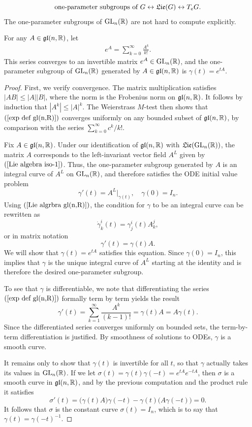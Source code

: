 \[\text{one-parameter subgroups of $G$}\leftrightarrow\mathfrak{Lie}(G)\leftrightarrow T_eG.\]
The one-parameter subgroups of $\mathrm{GL}_n(\mathbb{R})$ are not hard to compute explicitly.
\begin{proposition}
For any $A\in\mathfrak{gl}(n,\mathbb{R})$, let
\begin{align}\label{exp def gl(n,R)}
e^A=\sum_{k=0}^{\infty}\frac{A^k}{k!}.
\end{align}
This series converges to an invertible matrix $e^A\in\mathrm{GL}_n(\mathbb{R})$, and the one-parameter subgroup of $\mathrm{GL}_n(\mathbb{R})$ generated by $A\in\mathfrak{gl}(n,\mathbb{R})$ is $\gamma(t)=e^{tA}$.
\end{proposition}
\begin{proof}
First, we verify convergence. The matrix multiplication satisfies $|AB|\leq|A||B|$, where the norm is the Frobenius norm on $\mathfrak{gl}(n,\mathbb{R})$. It follows by induction that $|A^k|\leq |A|^k$. The Weierstrass $M$-test then shows that $(\ref{exp def gl(n,R)})$ converges uniformly on any bounded subset of $\mathfrak{gl}(n,\mathbb{R})$, by comparison with the series $\sum_{k=0}^{\infty}c^k/k!$.\par
Fix $A\in\mathfrak{gl}(n,\mathbb{R})$. Under our identification of $\mathfrak{gl}(n,\mathbb{R})$ with $\mathfrak{Lie}(\mathrm{GL}_n(\mathbb{R}))$, the matrix $A$ corresponds to the left-invariant vector field $A^L$ given by $(\ref{Lie algebra iso-1})$. Thus, the one-parameter subgroup generated by $A$ is an integral curve of $A^L$ on $\mathrm{GL}_n(\mathbb{R})$, and therefore satisfies the ODE initial value problem
\[\gamma'(t)=A^L|_{\gamma(t)},\quad \gamma(0)=I_n.\]
Using $(\ref{Lie algrbra gl(n,R)})$, the condition for $\gamma$ to be an integral curve can be rewritten as
\[\dot{\gamma}^i_k(t)=\gamma^i_j(t)A^j_k,\]
or in matrix notation
\[\gamma'(t)=\gamma(t)A.\]
We will show that $\gamma(t)=e^{tA}$ satisfies this equation. Since $\gamma(0)=I_n$, this implies that $\gamma$ is the unique integral curve of $A^L$ starting at the identity and is therefore the desired one-parameter subgroup.\par
To see that $\gamma$ is differentiable, we note that differentiating the series $(\ref{exp def gl(n,R)})$ formally term by term yields the result
\[\gamma'(t)=\sum_{k=1}^{\infty}\frac{A^k}{(k-1)!}=\gamma(t)A=A\gamma(t).\]
Since the differentiated series converges uniformly on bounded sets, the term-by-term differentiation is justified. By smoothness of solutions to ODEs, $\gamma$ is a smooth curve.\par
It remains only to show that $\gamma(t)$ is invertible for all $t$, so that $\gamma$ actually takes its values in $\mathrm{GL}_n(\mathbb{R})$. If we let $\sigma(t)=\gamma(t)\gamma(-t)=e^{tA}e^{-tA}$, then $\sigma$ is a smooth curve in $\mathfrak{gl}(n,\mathbb{R})$, and by the previous computation and the product rule it satisfies
\[\sigma'(t)=\big(\gamma(t)A\big)\gamma(-t)-\gamma(t)\big(A\gamma(-t)\big)=0.\]
It follows that $\sigma$ is the constant curve $\sigma(t)=I_n$, which is to say that
$\gamma(t)=\gamma(-t)^{-1}$. 
\end{proof}
